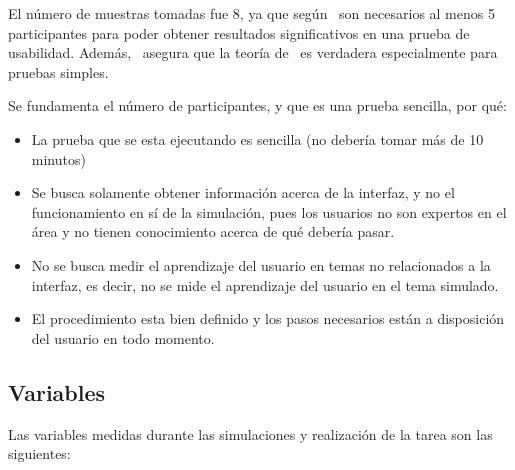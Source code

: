 El número de muestras tomadas fue 8, ya que según~\cite{nielsen2000} son necesarios
al menos 5 participantes para poder obtener resultados significativos en una prueba
de usabilidad. Además,~\cite{ritch2009} asegura que la teoría de~\cite{nielsen2000}
es verdadera especialmente para pruebas simples. 

Se fundamenta el número de participantes, y que es una prueba sencilla, por qué:

\begin{itemize}

\item La prueba que se esta ejecutando es sencilla (no debería tomar más de 10
    minutos) 

\item Se busca solamente obtener información acerca de la interfaz, y no el
    funcionamiento en sí de la simulación, pues los usuarios no son expertos en
    el área y no tienen conocimiento acerca de qué debería pasar. 

\item No se busca medir el aprendizaje del usuario en temas no relacionados a la
    interfaz, es decir, no se mide el aprendizaje del usuario en el tema
    simulado.

\item El procedimiento esta bien definido y los pasos necesarios están a
    disposición del usuario en todo momento.

\end{itemize}

\subsection{Variables}

Las variables medidas durante las simulaciones y realización de la tarea son las
siguientes:

